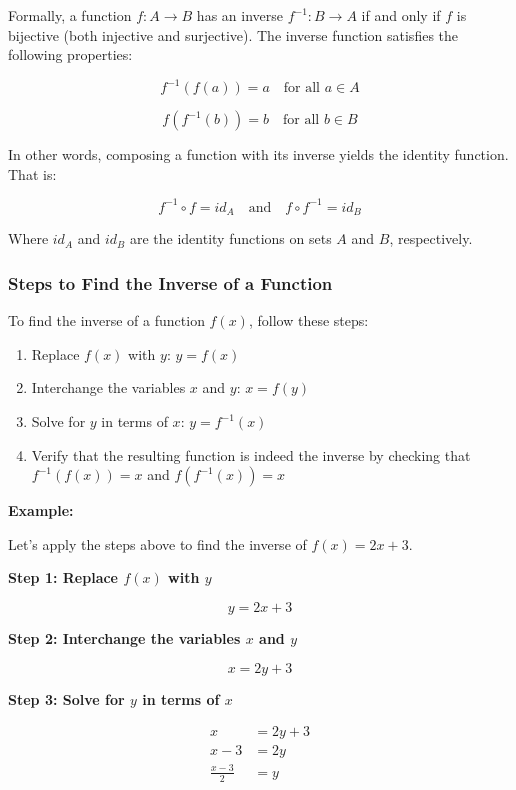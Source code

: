 Formally, a function \(f: A \to B\) has an inverse \(f^{-1}: B \to A\)  
if and only if \(f\) is bijective (both injective and surjective). The inverse function satisfies the 
following properties:

\[
	f^{-1}(f(a)) = a \quad \text{for all } a \in A
\]

\[
	f(f^{-1}(b)) = b \quad \text{for all } b \in B
\]

In other words, composing a function with its inverse yields the identity function. That is:

\[
	f^{-1} \circ f = id_A \quad \text{and} \quad f \circ f^{-1} = id_B
\]

Where \(id_A\) and \(id_B\) are the identity functions on sets \(A\) and \(B\), respectively.

\subsubsection{Steps to Find the Inverse of a Function}

To find the inverse of a function \(f (x)\), follow these steps:

\begin{enumerate}
	
	\item Replace \(f (x)\) with \(y\): \(y = f (x)\)
	
	\item Interchange the variables \(x\) and \(y\): \(x = f (y)\)
	
	\item Solve for \(y\) in terms of \(x\): \(y = f^{-1} (x)\)
	
	\item Verify that the resulting function is indeed the inverse by checking that \(f^{-1}(f(x)) = x\) 
		  and \(f (f^{-1} (x)) = x\)

		\end{enumerate}

\textbf{Example:}

Let's apply the steps above to find the inverse of \(f (x) = 2x + 3\).

\textbf{Step 1: Replace \(f(x)\) with \(y\)}

\[
	y = 2x + 3
\]

\textbf{Step 2: Interchange the variables \(x\) and \(y\)}

\[
	x = 2y + 3
\]

\textbf{Step 3: Solve for \(y\) in terms of \(x\)}

\begin{align*}
	x               & = 2y + 3 \\
	x - 3           & = 2y     \\
	\frac{x - 3}{2} & = y
\end{align*}

